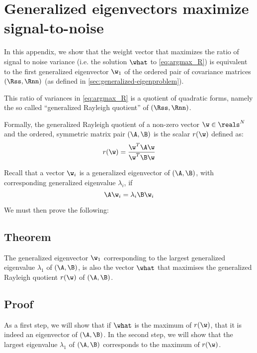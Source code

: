 \chapter{Generalized eigenvectors maximize signal-to-noise}
\label{apx:GEvecs-maximise-SNR}

In this appendix, we show that the weight vector that maximizes the ratio of signal to noise variance (i.e. the solution $\what$ to \cref{eq:argmax_R}) is equivalent to the first generalized eigenvector $\w_1$ of the ordered pair of covariance matrices $(\Rss, \Rnn)$ (as defined in \cref{sec:generalized-eigenproblem}).

This ratio of variances in \cref{eq:argmax_R} is a quotient of quadratic forms, namely the so called ``generalized Rayleigh quotient'' of $(\Rss, \Rnn)$.

Formally, the generalized Rayleigh quotient of a non-zero vector $\w \in \reals^N$ and the ordered, symmetric matrix pair $(\A,\B)$ is the scalar $r(\w)$ defined as:
%
\begin{equation}
\label{eq:Rayleigh}
r(\w) = \frac{\w^T \A \w}
             {\w^T \B \w}
\end{equation}

Recall that a vector $\w_i$ is a generalized eigenvector of $(\A,\B)$, with corresponding generalized eigenvalue $\lambda_i$, if
%
\begin{equation}
\label{eq:generalized-eigenproblem-AB}
\A \w_i = \lambda_i \B \w_i
\end{equation}

We must then prove the following:



\section{Theorem}

The generalized eigenvector $\w_1$ corresponding to the largest generalized eigenvalue $\lambda_1$ of $(\A,\B)$, is also the vector $\what$ that maximises the generalized Rayleigh quotient $r(\w)$ of $(\A,\B)$.




\section{Proof}

As a first step, we will show that if $\what$ is the maximum of $r(\w)$, that it is indeed an eigenvector of $(\A,\B)$. In the second step, we will show that the largest eigenvalue $\lambda_1$ of $(\A,\B)$ corresponds to the maximum of $r(\w)$.

